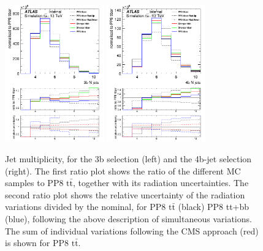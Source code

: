 \begin{figure}[!htb]
\centering
\includegraphics[width=0.38\textwidth]{Plots/ttbb/hisgenNjets_4j3t__div}
\includegraphics[width=0.38\textwidth]{Plots/ttbb/hisgenNjets_4j4t__div}
  \caption{Jet multiplicity, for the 3b selection (left) and the 4b-jet selection (right). The first ratio plot shows the ratio of the different MC samples to PP8 $\mathrm{t\bar{t}}$, together with its radiation uncertainties. The second ratio plot shows the relative uncertainty of the radiation variations divided by the nominal, for PP8 $\mathrm{t\bar{t}}$ (black) PP8 tt+bb (blue), following the above description of simultaneous variations. The sum of individual variations following the CMS approach (red) is shown for PP8 $\mathrm{t\bar{t}}$. \label{ttbb:Njets}}
\end{figure}


